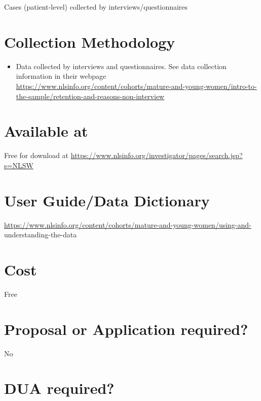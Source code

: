 \documentclass[
]{book}
\providecommand{\tightlist}{%
  \setlength{\itemsep}{0pt}\setlength{\parskip}{0pt}}
\begin{document}
Cases (patient-level) collected by interviews/questionnaires

\hypertarget{collection-methodology-56}{%
\section{Collection Methodology}\label{collection-methodology-56}}

\begin{itemize}
\tightlist
\item
  Data collected by interviews and questionnaires. See data collection information in their webpage
  \url{https://www.nlsinfo.org/content/cohorts/mature-and-young-women/intro-to-the-sample/retention-and-reasons-non-interview}
\end{itemize}

\hypertarget{available-at-56}{%
\section{Available at}\label{available-at-56}}

Free for download at \url{https://www.nlsinfo.org/investigator/pages/search.jsp?s=NLSW}

\hypertarget{user-guidedata-dictionary-56}{%
\section{User Guide/Data Dictionary}\label{user-guidedata-dictionary-56}}

\url{https://www.nlsinfo.org/content/cohorts/mature-and-young-women/using-and-} understanding-the-data

\hypertarget{cost-56}{%
\section{Cost}\label{cost-56}}

Free

\hypertarget{proposal-or-application-required-56}{%
\section{Proposal or Application required?}\label{proposal-or-application-required-56}}

No

\hypertarget{dua-required-56}{%
\section{DUA required?}\label{dua-required-56}}
\end{document}
